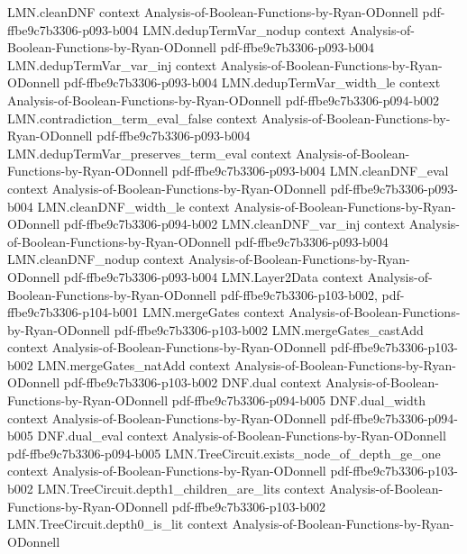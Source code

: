 \begin{lemma}
\proofstep
  {LMN.cleanDNF}
  {context}
  {Analysis-of-Boolean-Functions-by-Ryan-ODonnell}
  {pdf-ffbe9c7b3306-p093-b004}
\proofstep
  {LMN.dedupTermVar_nodup}
  {context}
  {Analysis-of-Boolean-Functions-by-Ryan-ODonnell}
  {pdf-ffbe9c7b3306-p093-b004}
\proofstep
  {LMN.dedupTermVar_var_inj}
  {context}
  {Analysis-of-Boolean-Functions-by-Ryan-ODonnell}
  {pdf-ffbe9c7b3306-p093-b004}
\proofstep
  {LMN.dedupTermVar_width_le}
  {context}
  {Analysis-of-Boolean-Functions-by-Ryan-ODonnell}
  {pdf-ffbe9c7b3306-p094-b002}
\proofstep
  {LMN.contradiction_term_eval_false}
  {context}
  {Analysis-of-Boolean-Functions-by-Ryan-ODonnell}
  {pdf-ffbe9c7b3306-p093-b004}
\proofstep
  {LMN.dedupTermVar_preserves_term_eval}
  {context}
  {Analysis-of-Boolean-Functions-by-Ryan-ODonnell}
  {pdf-ffbe9c7b3306-p093-b004}
\proofstep
  {LMN.cleanDNF_eval}
  {context}
  {Analysis-of-Boolean-Functions-by-Ryan-ODonnell}
  {pdf-ffbe9c7b3306-p093-b004}
\proofstep
  {LMN.cleanDNF_width_le}
  {context}
  {Analysis-of-Boolean-Functions-by-Ryan-ODonnell}
  {pdf-ffbe9c7b3306-p094-b002}
\proofstep
  {LMN.cleanDNF_var_inj}
  {context}
  {Analysis-of-Boolean-Functions-by-Ryan-ODonnell}
  {pdf-ffbe9c7b3306-p093-b004}
\proofstep
  {LMN.cleanDNF_nodup}
  {context}
  {Analysis-of-Boolean-Functions-by-Ryan-ODonnell}
  {pdf-ffbe9c7b3306-p093-b004}
\proofstep
  {LMN.Layer2Data}
  {context}
  {Analysis-of-Boolean-Functions-by-Ryan-ODonnell}
  {pdf-ffbe9c7b3306-p103-b002,
    pdf-ffbe9c7b3306-p104-b001}
\proofstep
  {LMN.mergeGates}
  {context}
  {Analysis-of-Boolean-Functions-by-Ryan-ODonnell}
  {pdf-ffbe9c7b3306-p103-b002}
\proofstep
  {LMN.mergeGates_castAdd}
  {context}
  {Analysis-of-Boolean-Functions-by-Ryan-ODonnell}
  {pdf-ffbe9c7b3306-p103-b002}
\proofstep
  {LMN.mergeGates_natAdd}
  {context}
  {Analysis-of-Boolean-Functions-by-Ryan-ODonnell}
  {pdf-ffbe9c7b3306-p103-b002}
\proofstep
  {DNF.dual}
  {context}
  {Analysis-of-Boolean-Functions-by-Ryan-ODonnell}
  {pdf-ffbe9c7b3306-p094-b005}
\proofstep
  {DNF.dual_width}
  {context}
  {Analysis-of-Boolean-Functions-by-Ryan-ODonnell}
  {pdf-ffbe9c7b3306-p094-b005}
\proofstep
  {DNF.dual_eval}
  {context}
  {Analysis-of-Boolean-Functions-by-Ryan-ODonnell}
  {pdf-ffbe9c7b3306-p094-b005}
\proofstep
  {LMN.TreeCircuit.exists_node_of_depth_ge_one}
  {context}
  {Analysis-of-Boolean-Functions-by-Ryan-ODonnell}
  {pdf-ffbe9c7b3306-p103-b002}
\proofstep
  {LMN.TreeCircuit.depth1_children_are_lits}
  {context}
  {Analysis-of-Boolean-Functions-by-Ryan-ODonnell}
  {pdf-ffbe9c7b3306-p103-b002}
\proofstep
  {LMN.TreeCircuit.depth0_is_lit}
  {context}
  {Analysis-of-Boolean-Functions-by-Ryan-ODonnell}

\end{lemma}
